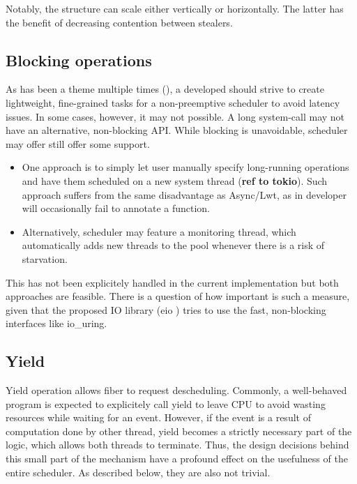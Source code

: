 \documentclass[12pt,a4paper,twoside]{report}
\begin{document}

Notably, the structure can scale either vertically or horizontally. The latter has the benefit of decreasing contention between stealers.  


\subsection{Blocking operations}
As has been a theme multiple times (), a developed should strive to create lightweight, fine-grained tasks for a non-preemptive scheduler to avoid latency issues. In some cases, however, it may not possible. A long system-call may not have an alternative, non-blocking API. While blocking is unavoidable, scheduler may offer still offer some support.
\begin{itemize}
    \item One approach is to simply let user manually specify long-running operations and have them scheduled on a new system thread (\textbf{ref to tokio}). Such approach suffers from the same disadvantage as Async/Lwt, as in developer will occasionally fail to annotate a function.
    \item Alternatively, scheduler may feature a monitoring thread, which automatically adds new threads to the pool whenever there is a risk of starvation.  
\end{itemize}

This has not been explicitely handled in the current implementation but both approaches are feasible. There is a question of how important is such a measure, given that the proposed IO library (eio ) tries to use the fast, non-blocking interfaces like io\_uring.

\subsection{Yield}
\label{section:yield}

Yield operation allows fiber to request descheduling. Commonly, a well-behaved program is expected to explicitely call yield to leave CPU to avoid wasting resources while waiting for an event. However, if the event is a result of computation done by other thread, yield becomes a strictly necessary part of the logic, which allows both threads to terminate. Thus, the design decisions behind this small part of the mechanism have a profound effect on the usefulness of the entire scheduler. As described below, they are also not trivial.
\end{document}
